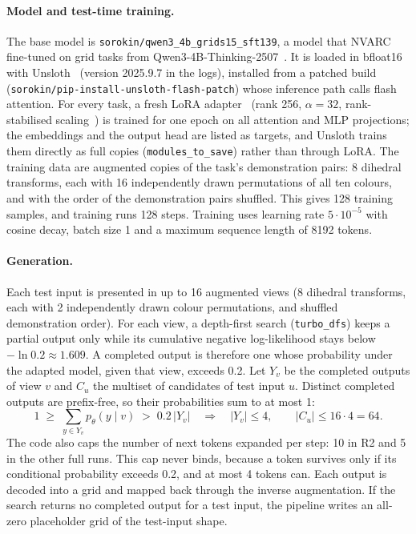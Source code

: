 \documentclass[11pt]{article}
\newcommand{\code}[1]{\texttt{#1}}
\newcommand{\R}[1]{R#1}
\begin{document}
\paragraph{Model and test-time training.}
The base model is \code{sorokin/qwen3\_4b\_grids15\_sft139}, a model that NVARC fine-tuned on grid tasks from Qwen3-4B-Thinking-2507~\citep{qwen3}. It is loaded in bfloat16 with Unsloth~\citep{unsloth} (version 2025.9.7 in the logs), installed from a patched build (\code{sorokin/pip-install-unsloth-flash-patch}) whose inference path calls flash attention.
For every task, a fresh LoRA adapter~\citep{hu2021lora} (rank 256, $\alpha=32$, rank-stabilised scaling~\citep{kalajdzievski2023rslora}) is trained for one epoch on all attention and MLP projections; the embeddings and the output head are listed as targets, and Unsloth trains them directly as full copies (\code{modules\_to\_save}) rather than through LoRA. The training data are augmented copies of the task's demonstration pairs: 8 dihedral transforms, each with 16 independently drawn permutations of all ten colours, and with the order of the demonstration pairs shuffled. This gives 128 training samples, and training runs 128 steps. Training uses learning rate $5\cdot10^{-5}$ with cosine decay, batch size 1 and a maximum sequence length of 8192 tokens.

\paragraph{Generation.}
Each test input is presented in up to 16 augmented views (8 dihedral transforms, each with 2 independently drawn colour permutations, and shuffled demonstration order). For each view, a depth-first search (\code{turbo\_dfs}) keeps a partial output only while its cumulative negative log-likelihood stays below $-\ln 0.2 \approx 1.609$. A completed output is therefore one whose probability under the adapted model, given that view, exceeds 0.2.
Let $Y_v$ be the completed outputs of view $v$ and $C_u$ the multiset of candidates of test input $u$. Distinct completed outputs are prefix-free, so their probabilities sum to at most 1:
\begin{equation}
\label{eq:bound}
1 \;\ge\; \sum_{y\in Y_v} p_\theta(y\mid v) \;>\; 0.2\,|Y_v|
\quad\Longrightarrow\quad |Y_v|\le 4, \qquad |C_u| \le 16\cdot 4 = 64 .
\end{equation}
The code also caps the number of next tokens expanded per step: 10 in \R{2} and 5 in the other full runs. This cap never binds, because a token survives only if its conditional probability exceeds 0.2, and at most 4 tokens can.
Each output is decoded into a grid and mapped back through the inverse augmentation.
If the search returns no completed output for a test input, the pipeline writes an all-zero placeholder grid of the test-input shape.
\end{document}
